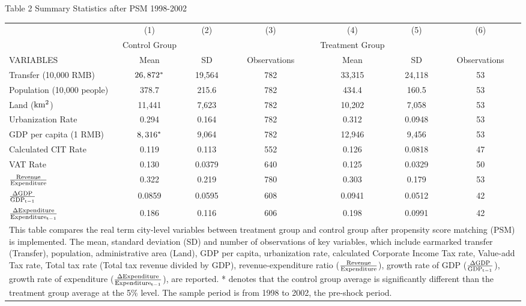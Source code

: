 \documentclass[11pt,a4paper]{article}
\begin{document}
\begin{center}
Table 2 Summary Statistics after PSM 1998-2002 \\
\medskip
\begin{scriptsize}
\begin{tabular}{lcccccc} \hline \hline
 & (1) & (2) & (3) & (4) & (5) & (6)  \\
& Control Group & &  & Treatment Group & &  \\
VARIABLES   & Mean & SD & Observations&  Mean & SD & Observations \\ \hline

Transfer (10,000 RMB)& ${\rm  26,872^{*}}$ & 19,564 & 782 & 33,315 & 24,118 & 53 \\
Population (10,000 people) & 378.7 & 215.6 & 782 & 434.4 & 160.5 & 53 \\
Land (${\rm km^{2}}$) & 11,441 & 7,623 & 782 & 10,202 & 7,058 & 53 \\
Urbanization Rate  & 0.294 & 0.164 & 782 & 0.312 & 0.0948 & 53  \\
GDP per capita (1 RMB) & ${\rm  8,316^{*}}$ & 9,064 & 782 & 12,946 & 9,456 & 53 \\
Calculated CIT Rate & 0.119 & 0.113 & 552 & 0.126 & 0.0818 & 47  \\
VAT Rate & 0.130 & 0.0379 & 640 & 0.125 & 0.0329 & 50\\
[0.5em]
${\rm \frac{Revenue}{Expenditure}}$ & 0.322 & 0.219 & 780 & 0.303 & 0.179 & 53\\
[0.5em]
${\rm \frac{\Delta GDP}{GDP_{t-1}}}$  & 0.0859 & 0.0595 & 608 & 0.0941 & 0.0512 & 42  \\
[0.5em]
${\rm \frac{\Delta Expenditure}{Expenditure_{t-1}}}$ & 0.186 & 0.116 & 606 & 0.198 & 0.0991 & 42  \\
\hline \hline
\multicolumn{7}{p{15.3cm}}{\footnotesize This table compares the real term city-level variables between treatment group and control group after propensity score matching (PSM) is implemented. The mean, standard deviation (SD) and number of observations of key variables, which include earmarked transfer (Transfer), population, administrative area (Land), GDP per capita, urbanization rate, calculated Corporate Income Tax rate, Value-add Tax rate, Total tax rate (Total tax revenue divided by GDP), revenue-expenditure ratio (${\rm \frac{Revenue}{Expenditure}}$), growth rate of GDP (${\rm \frac{\Delta GDP}{GDP_{t-1}}}$), growth rate of expenditure (${\rm \frac{\Delta Expenditure}{Expenditure_{t-1}}}$), are reported. * denotes that the control group average is significantly different than the treatment group average at the 5\% level. The sample period is from 1998 to 2002, the pre-shock period. }\\
\end{tabular}
\end{scriptsize}
\end{center}
\end{document}
